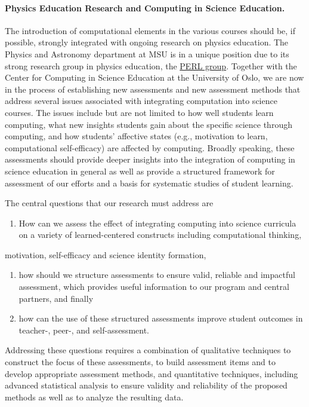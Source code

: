\documentclass[graybox,envcountchap,sectrefs]{svmult}
\begin{document}
\noindent
\paragraph{Physics Education Research and Computing in Science Education.}
The introduction of computational elements in the various courses should be, if possible,  strongly integrated with ongoing research on physics education.
The Physics and Astronomy department at MSU is in a unique position due to its strong research group in physics education, the \href{{http://www.pa.msu.edu/research/physics-education-lab}}{PERL group}. Together with the Center for Computing in Science Education at the University of Oslo, we are now in the process
of establishing new assessments
and new assessment methods that address several issues associated with
integrating computation into science courses. The issues include but
are not limited to how well students learn computing, what new
insights students gain about the specific science through computing,
and how students' affective states (e.g., motivation to learn,
computational self-efficacy) are affected by computing. Broadly
speaking, these assessments should provide deeper insights into the
integration of computing in science education in general as well as
provide a structured framework for assessment of our efforts and a
basis for systematic studies of student learning.  

The central questions that our research must address are 
\begin{enumerate}
\item How can we assess the effect of integrating computing into science curricula on a variety of learned-centered constructs including computational thinking,
\end{enumerate}

\noindent
motivation, self-efficacy and science identity formation, 
\begin{enumerate}
\item how should we structure assessments to ensure valid, reliable and impactful assessment, which provides useful information to our program and central partners, and finally 

\item how can the use of these structured assessments improve student outcomes in teacher-, peer-, and self-assessment.
\end{enumerate}

\noindent
Addressing these questions requires a combination of qualitative
techniques to construct the focus of these assessments, to build
assessment items and to develop appropriate assessment methods, and
quantitative techniques, including advanced statistical analysis to
ensure validity and reliability of the proposed methods as well as to
analyze the resulting data.
\end{document}

